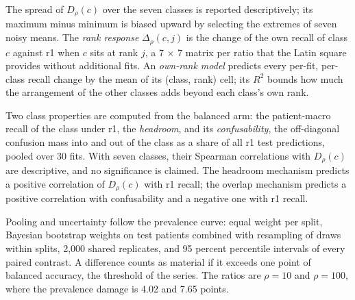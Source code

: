 \documentclass[11pt]{article}
\begin{document}
The spread of $D_\rho(c)$ over the seven classes is reported descriptively; its maximum minus minimum is biased upward by selecting the extremes of seven noisy means. The \emph{rank response} $\Delta_\rho(c,j)$ is the change of the own recall of class $c$ against r1 when $c$ sits at rank $j$, a 7 $\times$ 7 matrix per ratio that the Latin square provides without additional fits. An \emph{own-rank model} predicts every per-fit, per-class recall change by the mean of its (class, rank) cell; its $R^2$ bounds how much the arrangement of the other classes adds beyond each class's own rank.

Two class properties are computed from the balanced arm: the patient-macro recall of the class under r1, the \emph{headroom}, and its \emph{confusability}, the off-diagonal confusion mass into and out of the class as a share of all r1 test predictions, pooled over 30 fits. With seven classes, their Spearman correlations with $D_\rho(c)$ are descriptive, and no significance is claimed. The headroom mechanism predicts a positive correlation of $D_\rho(c)$ with r1 recall; the overlap mechanism predicts a positive correlation with confusability and a negative one with r1 recall.

Pooling and uncertainty follow the prevalence curve: equal weight per split, Bayesian bootstrap weights on test patients \citep{rubin1981bayesian} combined with resampling of draws within splits, 2,000 shared replicates, and 95 percent percentile intervals of every paired contrast. A difference counts as material if it exceeds one point of balanced accuracy, the threshold of the series. The ratios are $\rho=10$ and $\rho=100$, where the prevalence damage is 4.02 and 7.65 points.





\end{document}
